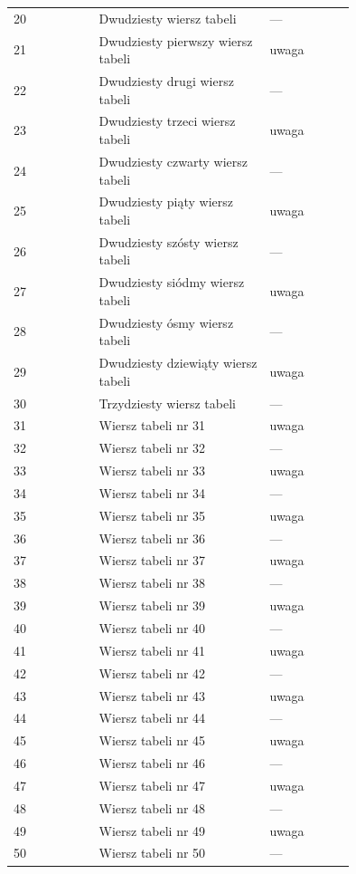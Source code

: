 {\begin{longtable}{@{} l L{0.5\linewidth} L{0.25\linewidth} @{}}
    20 & Dwudziesty wiersz tabeli              & --- \\
    21 & Dwudziesty pierwszy wiersz tabeli     & uwaga \\
    22 & Dwudziesty drugi wiersz tabeli        & --- \\
    23 & Dwudziesty trzeci wiersz tabeli       & uwaga \\
    24 & Dwudziesty czwarty wiersz tabeli      & --- \\
    25 & Dwudziesty piąty wiersz tabeli        & uwaga \\
    26 & Dwudziesty szósty wiersz tabeli       & --- \\
    27 & Dwudziesty siódmy wiersz tabeli       & uwaga \\
    28 & Dwudziesty ósmy wiersz tabeli         & --- \\
    29 & Dwudziesty dziewiąty wiersz tabeli    & uwaga \\
    30 & Trzydziesty wiersz tabeli             & --- \\
    31 & Wiersz tabeli nr 31                   & uwaga \\
    32 & Wiersz tabeli nr 32                   & --- \\
    33 & Wiersz tabeli nr 33                   & uwaga \\
    34 & Wiersz tabeli nr 34                   & --- \\
    35 & Wiersz tabeli nr 35                   & uwaga \\
    36 & Wiersz tabeli nr 36                   & --- \\
    37 & Wiersz tabeli nr 37                   & uwaga \\
    38 & Wiersz tabeli nr 38                   & --- \\
    39 & Wiersz tabeli nr 39                   & uwaga \\
    40 & Wiersz tabeli nr 40                   & --- \\
    41 & Wiersz tabeli nr 41                   & uwaga \\
    42 & Wiersz tabeli nr 42                   & --- \\
    43 & Wiersz tabeli nr 43                   & uwaga \\
    44 & Wiersz tabeli nr 44                   & --- \\
    45 & Wiersz tabeli nr 45                   & uwaga \\
    46 & Wiersz tabeli nr 46                   & --- \\
    47 & Wiersz tabeli nr 47                   & uwaga \\
    48 & Wiersz tabeli nr 48                   & --- \\
    49 & Wiersz tabeli nr 49                   & uwaga \\
    50 & Wiersz tabeli nr 50                   & --- \\
\end{longtable}
}
